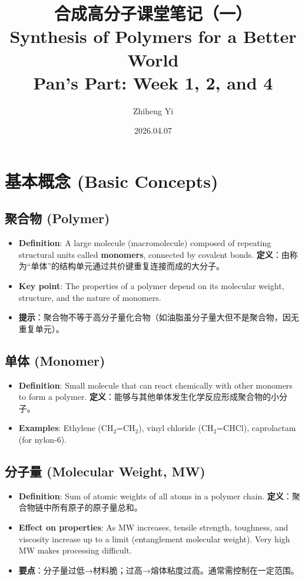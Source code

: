 \documentclass[12pt,a4paper]{ctexart}
\title{\textbf{合成高分子课堂笔记（一）}\\\large Synthesis of Polymers for a Better World \\\small Pan's Part: Week 1, 2, and 4 }
\author{Zhiheng Yi}
\date{2026.04.07}
\begin{document}
\maketitle

\tableofcontents
\newpage

\section{基本概念 (Basic Concepts)}

\subsection{聚合物 (Polymer)}
\begin{itemize}
    \item \textbf{Definition}: A large molecule (macromolecule) composed of repeating structural units called \textbf{monomers}, connected by covalent bonds.  
    \textbf{定义}：由称为“单体”的结构单元通过共价键重复连接而成的大分子。
    \item \textbf{Key point}: The properties of a polymer depend on its molecular weight, structure, and the nature of monomers.
    \item \textbf{提示}：聚合物不等于高分子量化合物（如油脂虽分子量大但不是聚合物，因无重复单元）。
\end{itemize}

\subsection{单体 (Monomer)}
\begin{itemize}
    \item \textbf{Definition}: Small molecule that can react chemically with other monomers to form a polymer.  
    \textbf{定义}：能够与其他单体发生化学反应形成聚合物的小分子。
    \item \textbf{Examples}: Ethylene (CH$_2$=CH$_2$), vinyl chloride (CH$_2$=CHCl), caprolactam (for nylon-6).
\end{itemize}

\subsection{分子量 (Molecular Weight, MW)}
\begin{itemize}
    \item \textbf{Definition}: Sum of atomic weights of all atoms in a polymer chain.  
    \textbf{定义}：聚合物链中所有原子的原子量总和。
    \item \textbf{Effect on properties}: As MW increases, tensile strength, toughness, and viscosity increase up to a limit (entanglement molecular weight). Very high MW makes processing difficult.
    \item \textbf{要点}：分子量过低→材料脆；过高→熔体粘度过高。通常需控制在一定范围。
\end{itemize}
\end{document}
